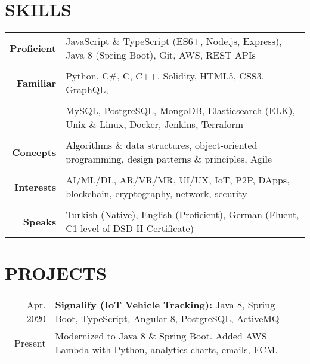 \documentclass[a4paper, 10pt]{article}
\begin{document}
\section{SKILLS}
{\renewcommand{\arraystretch}{0.7}
\begin{tabular}{r p{15.4cm}}
    \textbf{Proficient} & JavaScript \& TypeScript (ES6+, Node.js, Express), Java 8 (Spring Boot), Git, AWS, REST APIs\\\\
    \textbf{Familiar} & Python, C\#, C, C++, Solidity, HTML5, CSS3, GraphQL,\\\\
    & MySQL, PostgreSQL, MongoDB, Elasticsearch (ELK), Unix \& Linux, Docker, Jenkins, Terraform\\\\
    \textbf{Concepts} & Algorithms \& data structures, object-oriented programming, design patterns \& principles, Agile\\\\
    \textbf{Interests} & AI/ML/DL, AR/VR/MR, UI/UX, IoT, P2P, DApps, blockchain, cryptography, network, security\\\\
    \textbf{Speaks} & Turkish (Native), English (Proficient), German (Fluent, C1 level of DSD II Certificate)
\end{tabular}}

\section{PROJECTS}
\begin{tabular}{r p{15.7cm}}
    Apr. 2020 &  \textbf{Signalify (IoT Vehicle Tracking):} Java 8, Spring Boot, TypeScript, Angular 8, PostgreSQL, ActiveMQ\\
    Present & Modernized to Java 8 \& Spring Boot. Added AWS Lambda with Python, analytics charts, emails, FCM.
\end{tabular}
\end{document}
